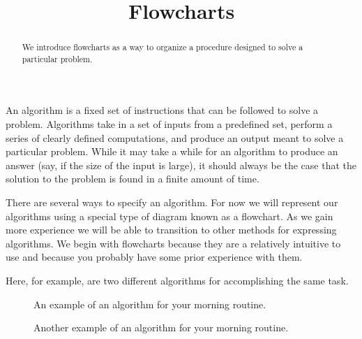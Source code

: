 \documentclass{ximera}
\title{Flowcharts}
\begin{document}
  
\begin{abstract}  
We introduce flowcharts as a way to organize a procedure designed to solve a particular problem.
\end{abstract}  
\maketitle

An algorithm is a fixed set of instructions that can be followed to solve a problem. Algorithms take in a set of inputs from a predefined set, perform a series of clearly defined computations, and produce an output meant to solve a particular problem. While it may take a while for an algorithm to produce an answer (say, if the size of the input is large), it should always be the case that the solution to the problem is found in a finite amount of time.


There are several ways to specify an algorithm. For now we will represent our algorithms using a special type of diagram known as a flowchart. As we gain more experience we will be able to transition to other methods for expressing algorithms. We begin with flowcharts because they are a relatively intuitive to use and because you probably have some prior experience with them.


Here, for example, are two different algorithms for accomplishing the same task. 

\begin{figure}[!ht]
	\centering
	\caption{An example of an algorithm for your morning routine.}
\end{figure}

\begin{figure}[!ht]
	\centering
	\caption{Another example of an algorithm for your morning routine.}
\end{figure}
\end{document}
